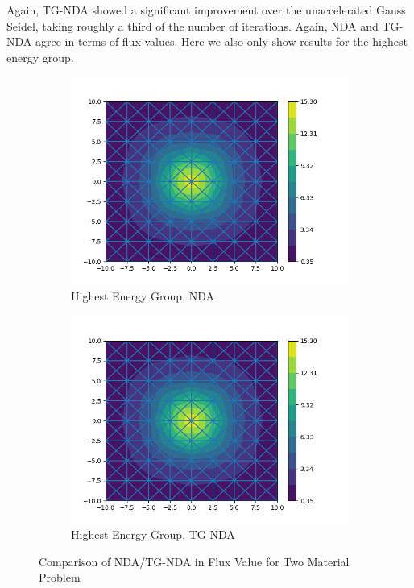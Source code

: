 Again, TG-NDA showed a significant improvement over the unaccelerated Gauss Seidel, taking roughly a third of the number of iterations. Again, NDA and TG-NDA agree in terms of flux values. Here we also only show results for the highest energy group. 
\begin{figure}[H]
\centering
\begin{subfigure}{.5\textwidth}
  \centering
  \includegraphics[width=\linewidth]{fig/nda_iron-water_scalar_flux_group0.png}
  \caption{Highest Energy Group, NDA}
  \label{fig:NDA-Mod}
\end{subfigure}%
\begin{subfigure}{.5\textwidth}
  \centering
  \includegraphics[width=\linewidth]{fig/tgnda_iron-water_scalar_flux_group0.png}
  \caption{Highest Energy Group, TG-NDA}
  \label{fig:TG-NDA-Mod}
\end{subfigure}
\caption{Comparison of NDA/TG-NDA in Flux Value for Two Material Problem}
\label{fig:Moderator}
\end{figure}

